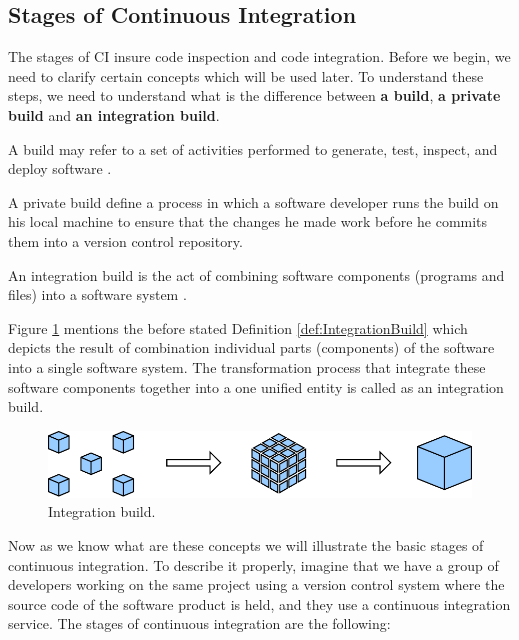 \subsection{Stages of Continuous Integration}

The stages of CI insure code inspection and code integration. Before we begin, we need to clarify certain concepts which will be used later. To understand these steps, we need to understand what is the difference between \textbf{a build}, \textbf{a private build} and \textbf{an integration build}.

\begin{DEF}
A build may refer to a set of activities performed to generate, test, inspect, and deploy software \cite{CIbook}.
\end{DEF}

\begin{DEF}
A private build define a process in which a software developer runs the build on his local machine to ensure that the changes he made work before he commits them into a version control repository.
\end{DEF}

\begin{DEF}\label{def:IntegrationBuild}
An integration build is the act of combining software components (programs and files) into a software system \cite{CIbook}.
\end{DEF}

Figure \ref{fig:IntegrationBuild} mentions the before stated Definition \ref{def:IntegrationBuild} which depicts the result of combination individual parts (components) of the software into a single software system. The transformation process that integrate these software components together into a one unified entity is called as an integration build.

\begin{figure}[H]
	\centering
	\includegraphics[scale=1]{img/system_integration.pdf}
	\caption{Integration build.}
	\label{fig:IntegrationBuild}
\end{figure}


Now as we know what are these concepts we will illustrate the basic stages of continuous integration. To describe it properly, imagine that we have a group of developers working on the same project using a version control system where the source code of the software product is held, and they use a continuous integration service. The stages of continuous integration are the following:

